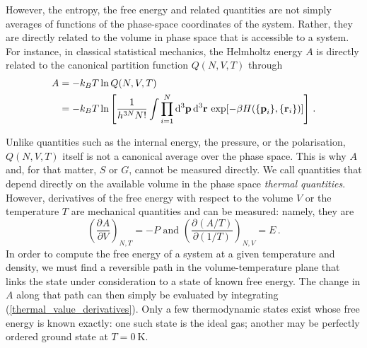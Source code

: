 \documentclass{article}
\theoremstyle{plain}\theoremheaderfont{\normalfont\bfseries}\theorembodyfont{\rmfamily}\theoremseparator{.}\newtheorem*{thm}{Theorem}\newtheorem*{law}{Law}\newtheorem*{pos}{Postulate}
\numberwithin{equation}{section}
\newcommand{\unit}[1]{\ \mathrm{#1}}
\newcommand{\dd}[2][]{\mathrm{d}^{#1} #2\,}
\newcommand{\pdv}[3][]{\frac{\partial^{#1} #2}{{\partial #3}^{#1}}}
\newcommand{\vb}[1]{\bm{\mathrm{#1}}}
\begin{document}
    However, the entropy, the free energy and related quantities are not simply averages of functions of the phase-space coordinates of the system. Rather, they are directly related to the volume in phase space that is accessible to a system. For instance, in classical statistical mechanics, the Helmholtz energy \(A\) is directly related to the canonical partition function \(Q(N,V,T)\) through
    \begin{align}
        A&=-k_BT\ln Q(N,V,T)\notag\\
        &=-k_B T\ln\left[\frac{1}{h^{3N}N!}\int\prod_{i=1}^{N}\dd[3]{\vb{p}}\dd[3]{\vb{r}}\exp[-\beta H(\{\vb{p}_i\},\{\vb{r}_i\})]\right]\,.
    \end{align}

    Unlike quantities such as the internal energy, the pressure, or the polarisation, \(Q(N,V,T)\) itself is not a canonical average over the phase space. This is why \(A\) and, for that matter, \(S\) or \(G\), cannot be measured directly. We call quantities that depend directly on the available volume in the phase space \textit{thermal quantities}. However, derivatives of the free energy with respect to the volume \(V\) or the temperature \(T\) are mechanical quantities and can be measured: namely, they are
    \begin{equation}\label{thermal_value_derivatives}
        \left(\pdv{A}{V}\right)_{N,T}=-P\text{ and }\left(\pdv{(A/T)}{(1/T)}\right)_{N,V}=E\,.
    \end{equation}
    In order to compute the free energy of a system at a given temperature and density, we must find a reversible path in the volume-temperature plane that links the state under consideration to a state of known free energy. The change in \(A\) along that path can then simply be evaluated by integrating (\ref{thermal_value_derivatives}). Only a few thermodynamic states exist whose free energy is known exactly: one such state is the ideal gas; another may be perfectly ordered ground state at \(T=0\unit{K}\).
\end{document}
